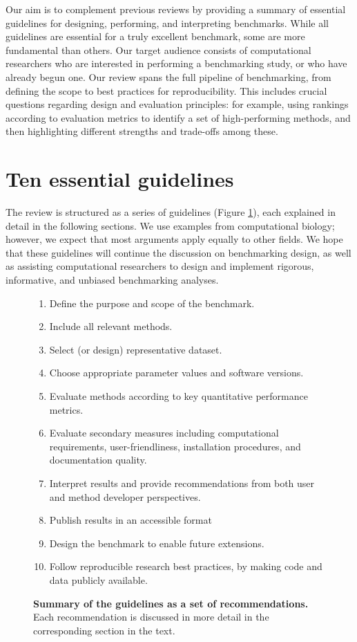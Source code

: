Our aim is to complement previous reviews by providing a summary of essential guidelines for designing, performing, and interpreting benchmarks. While all guidelines are essential for a truly excellent benchmark, some are more fundamental than others. Our target audience consists of computational researchers who are interested in performing a benchmarking study, or who have already begun one. Our review spans the full pipeline of benchmarking, from defining the scope to best practices for reproducibility. This includes crucial questions regarding design and evaluation principles: for example, using rankings according to evaluation metrics to identify a set of high-performing methods, and then highlighting different strengths and trade-offs among these.

\section{Ten essential guidelines}
The review is structured as a series of guidelines (Figure \ref{fig:summary_guidelines}), each explained in detail in the following sections. We use examples from computational biology; however, we expect that most arguments apply equally to other fields. We hope that these guidelines will continue the discussion on benchmarking design, as well as assisting computational researchers to design and implement rigorous, informative, and unbiased benchmarking analyses.

\begin{figure}[htb!]
	\centering
	\begin{tcolorbox}
		\begin{enumerate}
			\item Define the purpose and scope of the benchmark.
			\item Include all relevant methods.
			\item Select (or design) representative dataset.
			\item Choose appropriate parameter values and software versions.
			\item Evaluate methods according to key quantitative performance metrics.
			\item Evaluate secondary measures including computational requirements, user-friendliness, installation procedures, and documentation quality.
			\item Interpret results and provide recommendations from both user and method developer perspectives.
			\item Publish results in an accessible format
			\item Design the benchmark to enable future extensions.
			\item Follow reproducible research best practices, by making code and data publicly available.
		\end{enumerate}
  \end{tcolorbox}
	\caption{\textbf{Summary of the guidelines as a set of recommendations.} Each recommendation is discussed in more detail in the corresponding section in the text.}
	\label{fig:summary_guidelines}
\end{figure}

